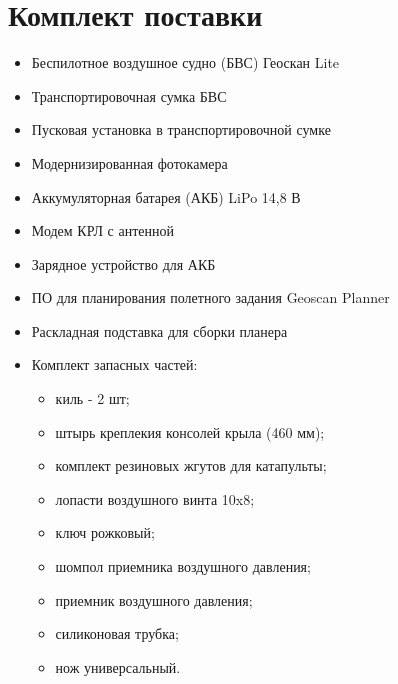 \documentclass[a4paper,10pt,russian,openany]{sphinxmanual}
\begin{document}
\section{Комплект поставки}
\label{\detokenize{reference:id2}}\begin{itemize}
\item {} 
Беспилотное воздушное судно (БВС) Геоскан Lite

\item {} 
Транспортировочная сумка БВС

\item {} 
Пусковая установка в транспортировочной сумке

\item {} 
Модернизированная фотокамера

\item {} 
Аккумуляторная батарея (АКБ) LiPo 14,8 В

\item {} 
Модем КРЛ с антенной

\item {} 
Зарядное устройство для АКБ

\item {} 
ПО для планирования полетного задания Geoscan Planner

\item {} 
Раскладная подставка для сборки планера

\item {} 
Комплект запасных частей:
\begin{itemize}
\item {} 
киль - 2 шт;

\item {} 
штырь креплекия консолей крыла (460 мм);

\item {} 
комплект резиновых жгутов для катапульты;

\item {} 
лопасти воздушного винта 10x8;

\item {} 
ключ рожковый;

\item {} 
шомпол приемника воздушного давления;

\item {} 
приемник воздушного давления;

\item {} 
силиконовая трубка;

\item {} 
нож универсальный.

\end{itemize}

\end{itemize}
\end{document}
